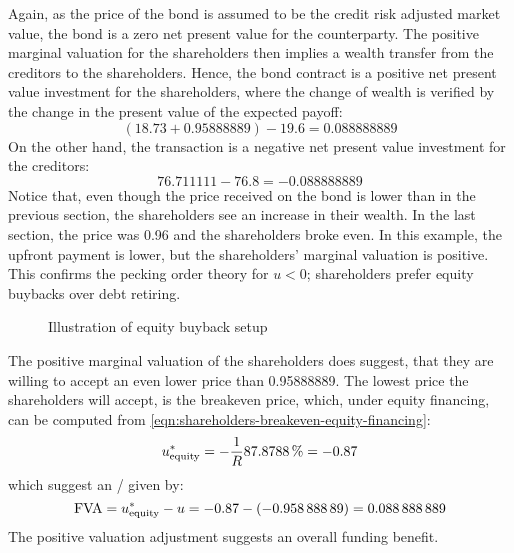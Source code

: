 \documentclass[main.tex]{subfiles}
\begin{document}
            Again, as the price of the bond is assumed to be the credit risk adjusted market value,
            the bond is a zero net present value for the counterparty.
            The positive marginal valuation for the shareholders then implies a wealth transfer from the creditors to the shareholders.
            Hence, the bond contract is a positive net present value investment for the shareholders, 
            where the change of wealth is verified by the change in the present value of the expected payoff:
            \begin{equation*}
                (\num{18.73} + \num{0.95888889}) - \num{19.6} = \num{0.088888889}
            \end{equation*}
            On the other hand, the transaction is a negative net present value investment for the creditors:
            \begin{equation*}
                \num{76.711111} - \num{76.8} = \num{-0.088888889}
            \end{equation*}
            Notice that, even though the price received on the bond is lower than in the previous section,
            the shareholders see an increase in their wealth.
            In the last section, the price was \num{0.96} and the shareholders broke even.
            In this example, the upfront payment is lower, 
            but the shareholders' marginal valuation is positive.
            This confirms the pecking order theory for $u<0$;
            shareholders prefer equity buybacks over debt retiring.
            \begin{figure}[t]
                \centering
                \caption{Illustration of equity buyback setup}
                \label{fig:equity-buyback-setup}
            \end{figure}

            The positive marginal valuation of the shareholders does suggest,
            that they are willing to accept an even lower price than \num{0.95888889}.
            The lowest price the shareholders will accept, is the breakeven price,
            which, under equity financing, can be computed from 
            \cref{eqn:shareholders-breakeven-equity-financing}:
            \begin{equation*}
                u_{\text{equity}}^{\ast} =
                - \discountfactor
                \pct{0.878788}
                = \num{-0.87}
            \end{equation*}
            which suggest an \FVA/ given by:
            \begin{equation*}
                \FVA/ =
                u_{\text{equity}}^{\ast} - u =
                \num{-0.87} - \left(\num{-0.95888889}\right) =
                \num{0.088888889}
            \end{equation*}
            The positive valuation adjustment suggests an overall funding benefit.
            
\end{document}
